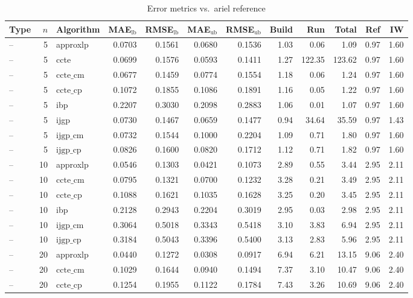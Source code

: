 \begin{table}[ht]
\centering
\scriptsize
\caption{Error metrics vs.\ ariel reference}
\begin{tabular}{lrlrrrrrrrrr}
\toprule
Type & $n$ & Algorithm & MAE$_{\text{lb}}$ & RMSE$_{\text{lb}}$ & MAE$_{\text{ub}}$ & RMSE$_{\text{ub}}$ & Build & Run & Total & Ref & IW \\
\midrule
-- & 5 & approxlp & 0.0703 & 0.1561 & 0.0680 & 0.1536 & 1.03 & 0.06 & 1.09 & 0.97 & 1.60 \\
-- & 5 & ccte & 0.0699 & 0.1576 & 0.0593 & 0.1411 & 1.27 & 122.35 & 123.62 & 0.97 & 1.60 \\
-- & 5 & $\text{ccte\_cm}$ & 0.0677 & 0.1459 & 0.0774 & 0.1554 & 1.18 & 0.06 & 1.24 & 0.97 & 1.60 \\
-- & 5 & $\text{ccte\_cp}$ & 0.1072 & 0.1855 & 0.1086 & 0.1891 & 1.16 & 0.05 & 1.22 & 0.97 & 1.60 \\
-- & 5 & ibp & 0.2207 & 0.3030 & 0.2098 & 0.2883 & 1.06 & 0.01 & 1.07 & 0.97 & 1.60 \\
-- & 5 & ijgp & 0.0730 & 0.1467 & 0.0659 & 0.1477 & 0.94 & 34.64 & 35.59 & 0.97 & 1.43 \\
-- & 5 & $\text{ijgp\_cm}$ & 0.0732 & 0.1544 & 0.1000 & 0.2204 & 1.09 & 0.71 & 1.80 & 0.97 & 1.60 \\
-- & 5 & $\text{ijgp\_cp}$ & 0.0826 & 0.1600 & 0.0820 & 0.1712 & 1.12 & 0.71 & 1.82 & 0.97 & 1.60 \\
-- & 10 & approxlp & 0.0546 & 0.1303 & 0.0421 & 0.1073 & 2.89 & 0.55 & 3.44 & 2.95 & 2.11 \\
-- & 10 & $\text{ccte\_cm}$ & 0.0795 & 0.1321 & 0.0700 & 0.1232 & 3.28 & 0.21 & 3.49 & 2.95 & 2.11 \\
-- & 10 & $\text{ccte\_cp}$ & 0.1088 & 0.1621 & 0.1035 & 0.1628 & 3.25 & 0.20 & 3.45 & 2.95 & 2.11 \\
-- & 10 & ibp & 0.2128 & 0.2943 & 0.2204 & 0.3019 & 2.95 & 0.03 & 2.98 & 2.95 & 2.11 \\
-- & 10 & $\text{ijgp\_cm}$ & 0.3064 & 0.5018 & 0.3343 & 0.5418 & 3.10 & 3.83 & 6.94 & 2.95 & 2.11 \\
-- & 10 & $\text{ijgp\_cp}$ & 0.3184 & 0.5043 & 0.3396 & 0.5400 & 3.13 & 2.83 & 5.96 & 2.95 & 2.11 \\
-- & 20 & approxlp & 0.0440 & 0.1272 & 0.0308 & 0.0917 & 6.94 & 6.21 & 13.15 & 9.06 & 2.40 \\
-- & 20 & $\text{ccte\_cm}$ & 0.1029 & 0.1644 & 0.0940 & 0.1494 & 7.37 & 3.10 & 10.47 & 9.06 & 2.40 \\
-- & 20 & $\text{ccte\_cp}$ & 0.1254 & 0.1955 & 0.1122 & 0.1784 & 7.43 & 3.26 & 10.69 & 9.06 & 2.40 \\

\end{tabular}
\end{table}
